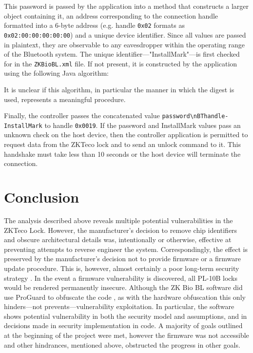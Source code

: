 \documentclass[conference]{IEEEtran}
\begin{document}
\bigskip

This password is passed by the application into a method that constructs a larger object containing it, an address corresponding to the connection handle formatted into a 6-byte address (e.g. handle \verb|0x02| formats as \verb|0x02:00:00:00:00:00|) and a unique device identifier.  Since all values are passed in plaintext, they are observable to any eavesdropper within the operating range of the Bluetooth system.  The unique identifier---"InstallMark"---is first checked for in the \verb|ZKBioBL.xml| file.  If not present, it is constructed by the application using the following Java algorithm:



It is unclear if this algorithm, in particular the manner in which the digest is used, represents a meaningful procedure.

\bigskip

Finally, the controller passes the concatenated value \verb|password\nBThandle-InstallMark| to handle \verb|0x0019|.  If the password and InstallMark values pass an unknown check on the host device, then the controller application is permitted to request data from the ZKTeco lock and to send an unlock command to it.  This handshake must take less than 10 seconds or the host device will terminate the connection.

\section{Conclusion}

The analysis described above reveals multiple potential vulnerabilities in the ZKTeco Lock. However, the manufacturer's decision to remove chip identifiers and obscure architectural details was, intentionally or otherwise, effective at preventing attempts to reverse engineer the system.  Correspondingly, the effect is preserved by the manufacturer's decision not to provide firmware or a firmware update procedure.  This is, however, almost certainly a poor long-term security strategy \cite{Rescorla2003}.  In the event a firmware vulnerability is discovered, all PL-10B locks would be rendered permanently insecure.  Although the ZK Bio BL software did use ProGuard to obfuscate the code \cite{AndroidDevelopers}, as with the hardware obfuscation this only hinders---not prevents---vulnerability exploitation.  In particular, the software shows potential vulnerability in both the security model and assumptions, and in decisions made in security implementation in code. A majority of goals outlined at the beginning of the project were met, however the firmware was not accessible and other hindrances, mentioned above, obstructed the progress in other goals.
\end{document}
